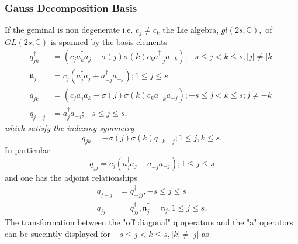 \documentclass[aps,preprint]{revtex4}%
\begin{document}
\subsubsection{Gauss Decomposition Basis}

If the geminal is non degenerate i.e. $c_{j}\neq c_{k}$ the Lie algebra,
$gl\left(  2s,\mathbb{C}\right)  ,$ of $GL\left(  2s,\mathbb{C}\right)  $ is
spanned by the basis elements
\begin{align}
q_{jk}^{\dagger}  &  =\left(  c_{j}a_{k}^{\dagger}a_{j}-\sigma\left(
j\right)  \sigma\left(  k\right)  c_{k}a_{-j}^{\dagger}a_{-k}\right)  ;-s\leq
j<k\leq s,\left\vert j\right\vert \neq\left\vert k\right\vert \nonumber\\
\mathfrak{n}_{j}  &  =c_{j}\left(  a_{j}^{\dagger}a_{j}+a_{-j}^{\dagger}%
a_{-j}\right)  ;1\leq j\leq s\nonumber\\
q_{jk}  &  =\left(  c_{j}a_{j}^{\dagger}a_{k}-\sigma\left(  j\right)
\sigma\left(  k\right)  c_{k}a_{-k}^{\dagger}a_{-j}\right)  ;-s\leq j<k\leq
s;j\neq-k\nonumber\\
q_{j-j}  &  =a_{j}^{\dagger}a_{-j};-s\leq j\leq s,
\end{align}
\emph{which satisfy the indexing symmetry}%
\begin{equation}
q_{jk}=-\sigma\left(  j\right)  \sigma\left(  k\right)  q_{-k-j};1\leq j,k\leq
s.
\end{equation}
In particular
\begin{equation}
q_{jj}=c_{j}\left(  a_{j}^{\dagger}a_{j}-a_{-j}^{\dagger}a_{-j}\right)  ;1\leq
j\leq s\nonumber
\end{equation}
and one has the adjoint relationships%
\begin{align}
q_{j-j}  &  =q_{-jj}^{\dagger},-s\leq j\leq s\nonumber\\
q_{jj}  &  =q_{jj}^{\dagger},\mathfrak{n}_{j}^{\dagger}=\mathfrak{n}_{j},1\leq
j\leq s.
\end{align}
The transformation between the "off diagonal" q operators and the "a"
operators can be succintly displayed for $-s\leq j<k\leq s,\left\vert
k\right\vert \neq\left\vert j\right\vert $ as
\end{document}
